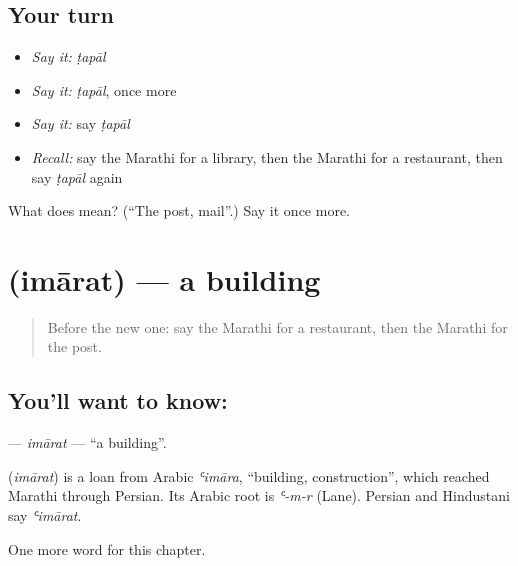 \subsection*{Your turn}
\begin{itemize}
\raggedright
  \item \emph{Say it:} \emph{ṭapāl}
  \item \emph{Say it:} \emph{ṭapāl}, once more
  \item \emph{Say it:} say \emph{ṭapāl}
  \item \emph{Recall:} say the Marathi for a library, then the Marathi for a restaurant, then say \emph{ṭapāl} again
\end{itemize}

\begin{tcolorbox}[breakable,colback=teal!4,colframe=teal!35!black,title={Before you move on}]
What does  mean? (\textquotedblleft{}The post, mail\textquotedblright{}.) Say it once more.
\end{tcolorbox}
\section[\texorpdfstring{\mr{इमारत} (imārat)}{इमारत (imārat)}]{ (imārat) — a building}

\label{lesson:MR-C129-imarat}



\begin{quote}
Before the new one: say the Marathi for a restaurant, then the Marathi for the post.
\end{quote}

\subsection*{You'll want to know: }
\textbf{} — \emph{imārat} — \textquotedblleft{}a building\textquotedblright{}.

\begin{cousinweb}
\textbf{} (\emph{imārat}) is a loan from Arabic \emph{ʿimāra}, \textquotedblleft{}building, construction\textquotedblright{}, which reached Marathi through Persian. Its Arabic root is \emph{ʿ-m-r} (Lane). Persian and Hindustani say \emph{ʿimārat}.
\end{cousinweb}

\begin{grammarlens}[title={What you've built}]
One more word for this chapter.
\end{grammarlens}

